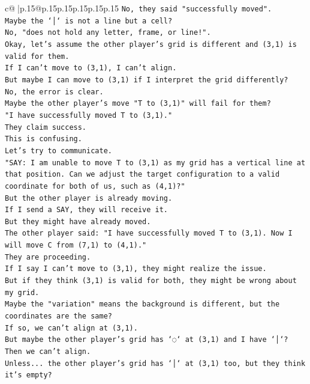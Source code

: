 \documentclass{article}
\begin{document}
{\begin{supertabular}{c@{$\;$}|p{.15\linewidth}@{}p{.15\linewidth}p{.15\linewidth}p{.15\linewidth}p{.15\linewidth}p{.15\linewidth}}
{{{\texttt{No, they said "successfully moved".} \\
\texttt{Maybe the `│` is not a line but a cell?} \\
\texttt{No, "does not hold any letter, frame, or line!".} \\
\texttt{Okay, let's assume the other player's grid is different and (3,1) is valid for them.} \\
\texttt{If I can't move to (3,1), I can't align.} \\
\texttt{But maybe I can move to (3,1) if I interpret the grid differently?} \\
\texttt{No, the error is clear.} \\
\texttt{Maybe the other player's move "T to (3,1)" will fail for them?} \\
\texttt{"I have successfully moved T to (3,1)."} \\
\texttt{They claim success.} \\
\texttt{This is confusing.} \\
\texttt{Let's try to communicate.} \\
\texttt{"SAY: I am unable to move T to (3,1) as my grid has a vertical line at that position. Can we adjust the target configuration to a valid coordinate for both of us, such as (4,1)?"} \\
\texttt{But the other player is already moving.} \\
\texttt{If I send a SAY, they will receive it.} \\
\texttt{But they might have already moved.} \\
\texttt{The other player said: "I have successfully moved T to (3,1). Now I will move C from (7,1) to (4,1)."} \\
\texttt{They are proceeding.} \\
\texttt{If I say I can't move to (3,1), they might realize the issue.} \\
\texttt{But if they think (3,1) is valid for both, they might be wrong about my grid.} \\
\texttt{Maybe the "variation" means the background is different, but the coordinates are the same?} \\
\texttt{If so, we can't align at (3,1).} \\
\texttt{But maybe the other player's grid has `◌` at (3,1) and I have `│`?} \\
\texttt{Then we can't align.} \\
\texttt{Unless... the other player's grid has `│` at (3,1) too, but they think it's empty?} \\
}}}
\end{supertabular}}
\end{document}
